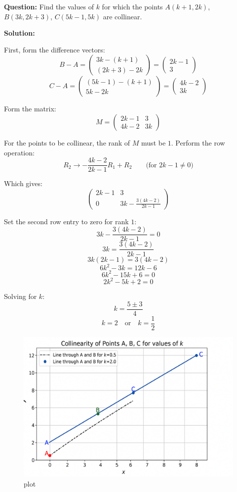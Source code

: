 \documentclass[journal]{IEEEtran}
\begin{document}
\textbf{Question:} 
Find the values of $k$ for which the points $A(k+1, 2k)$, $B(3k, 2k+3)$, $C(5k-1, 5k)$ are collinear. 
\vspace{0.5cm}

\textbf{Solution:}

First, form the difference vectors:
\[
 B - A = 
\begin{pmatrix}
3k - (k+1) \\ (2k+3) - 2k
\end{pmatrix}
=
\begin{pmatrix}
2k - 1 \\ 3
\end{pmatrix}
\]
\[
  C - A =
\begin{pmatrix}
(5k-1) - (k+1) \\ 5k - 2k
\end{pmatrix}
=
\begin{pmatrix}
4k - 2 \\ 3k
\end{pmatrix}
\]

Form the matrix:
\[
M = \begin{pmatrix}
2k-1 & 3 \\
4k-2 & 3k
\end{pmatrix}
\]

For the points to be collinear, the rank of $M$ must be $1$. Perform the row operation:
\[
R_2 \to -\frac{4k-2}{2k-1}R_1 + R_2 \qquad \text{(for $2k-1 \neq 0$)}
\]

Which gives:
\[
\begin{pmatrix}
2k-1 & 3 \\
0 & 3k - \frac{3(4k-2)}{2k-1}
\end{pmatrix}
\]

Set the second row entry to zero for rank $1$:
\[
3k - \frac{3(4k-2)}{2k-1} = 0
\]
\[
3k = \frac{3(4k-2)}{2k-1}
\]
\[
3k(2k-1) = 3(4k-2)
\]
\[
6k^2 - 3k = 12k - 6
\]
\[
6k^2 - 15k + 6 = 0
\]
\[
2k^2 - 5k + 2 = 0
\]

Solving for $k$:
\[
k = \frac{5 \pm 3}{4}
\]
\[
k = 2 \quad \text{or} \quad k = \frac{1}{2}
\]
\begin{figure}
    \centering
    \includegraphics[width=1\linewidth]{figs/plot.png}
    \caption{plot}
    \label{fig:placeholder}
\end{figure}
\end{document}
